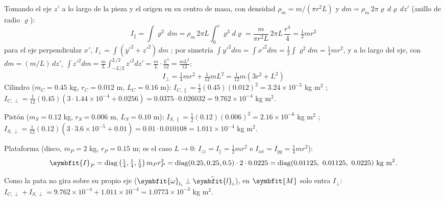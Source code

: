 \documentclass[11pt,a4paper]{article}
\numberwithin{equation}{section}
\newenvironment{apunte}[2]{\par\noindent\ignorespaces}{\par}
\newenvironment{ojo}{\begin{apunte}{ojo}{Ojo:}}{\end{apunte}}
\newcommand{\vect}[1]{\symbfit{#1}}
\begin{document}
Tomando el eje $z'$ a lo largo de la pieza y el origen en su centro de masa, con densidad $\rho_m = m/(\pi r^2L)$ y $dm = \rho_m\,2\pi\varrho\,d\varrho\,dz'$ (anillo de radio $\varrho$):
\[
I_\parallel = \int\varrho^2\,dm = \rho_m\,2\pi L\int_0^r\varrho^3d\varrho = \frac{m}{\pi r^2L}\,2\pi L\,\frac{r^4}{4} = \tfrac12mr^2
\]
para el eje perpendicular $x'$, $I_\perp = \int(y'^2 + z'^2)\,dm$ ; por simetría $\int y'^2dm = \int x'^2dm = \tfrac12\int\varrho^2dm = \tfrac14mr^2$, y a lo largo del eje, con $dm = (m/L)\,dz'$, $\int z'^2dm = \frac mL\int_{-L/2}^{L/2}z'^2dz' = \frac mL\cdot\frac{L^3}{12} = \frac{mL^2}{12}$:
\[
I_\perp = \tfrac14mr^2 + \tfrac1{12}mL^2 = \tfrac1{12}m\left(3r^2 + L^2\right)
\]
Cilindro ($m_C = 0.45$ kg, $r_C = 0.012$ m, $L_C = 0.16$ m): $I_{C,\parallel} = \tfrac12(0.45)(0.012)^2 = 3.24\times10^{-5}$ kg m$^2$ ; $I_{C,\perp} = \tfrac1{12}(0.45)\left(3\cdot1.44\times10^{-4} + 0.0256\right) = 0.0375\cdot0.026032 = 9.762\times10^{-4}$ kg m$^2$.

Pistón ($m_S = 0.12$ kg, $r_S = 0.006$ m, $L_S = 0.10$ m): $I_{S,\parallel} = \tfrac12(0.12)(0.006)^2 = 2.16\times10^{-6}$ kg m$^2$ ; $I_{S,\perp} = \tfrac1{12}(0.12)\left(3\cdot3.6\times10^{-5} + 0.01\right) = 0.01\cdot0.010108 = 1.011\times10^{-4}$ kg m$^2$.

Plataforma (disco, $m_P = 2$ kg, $r_P = 0.15$ m; es el caso $L \to 0$: $I_{zz} = I_\parallel = \tfrac12mr^2$ e $I_{xx} = I_{yy} = \tfrac14mr^2$):
\begin{equation*}
\vect I_P = \mathrm{diag}\left(\tfrac14, \tfrac14, \tfrac12\right)m_Pr_P^2 = \mathrm{diag}(0.25, 0.25, 0.5)\cdot2\cdot0.0225 = \mathrm{diag}(0.01125,\ 0.01125,\ 0.0225)\ \text{kg m}^2.
\end{equation*}
\begin{ojo}
Como la pata no gira sobre su propio eje ($\vect\omega_{l_i}\perp\hat{\vect l}_i$), en $\vect M$ solo entra $I_\perp$: $I_{C,\perp} + I_{S,\perp} = 9.762\times10^{-4} + 1.011\times10^{-4} = 1.0773\times10^{-3}$ kg m$^2$.
\end{ojo}
\end{document}
